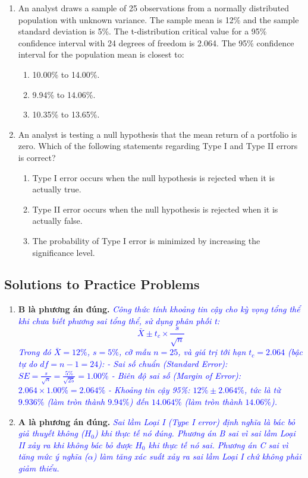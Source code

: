 \begin{enumerate}
	\item An analyst draws a sample of 25 observations from a normally distributed population with unknown variance. The sample mean is 12\% and the sample standard deviation is 5\%. The t-distribution critical value for a 95\% confidence interval with 24 degrees of freedom is 2.064. The 95\% confidence interval for the population mean is closest to:
	      \begin{enumerate}[label=\Alph*.]
		      \item 10.00\% to 14.00\%.
		      \item 9.94\% to 14.06\%.
		      \item 10.35\% to 13.65\%.
	      \end{enumerate}

	\item An analyst is testing a null hypothesis that the mean return of a portfolio is zero. Which of the following statements regarding Type I and Type II errors is correct?
	      \begin{enumerate}[label=\Alph*.]
		      \item Type I error occurs when the null hypothesis is rejected when it is actually true.
		      \item Type II error occurs when the null hypothesis is rejected when it is actually false.
		      \item The probability of Type I error is minimized by increasing the significance level.
	      \end{enumerate}
\end{enumerate}

\subsection{Solutions to Practice Problems}
\label{subsec:app_Solutions_M7}

\begin{enumerate}
	\item \textbf{B là phương án đúng.} \textcolor{blue}{\textit{Công thức tính khoảng tin cậy cho kỳ vọng tổng thể khi chưa biết phương sai tổng thể, sử dụng phân phối t:
	      \[
	      \bar{X} \pm t_c \times \frac{s}{\sqrt{n}}
	      \]
	      Trong đó $\bar{X} = 12\%$, $s = 5\%$, cỡ mẫu $n = 25$, và giá trị tới hạn $t_c = 2.064$ (bậc tự do $df = n - 1 = 24$):
	      - Sai số chuẩn (Standard Error): $SE = \frac{s}{\sqrt{n}} = \frac{5\%}{\sqrt{25}} = 1.00\%$
	      - Biên độ sai số (Margin of Error): $2.064 \times 1.00\% = 2.064\%$
	      - Khoảng tin cậy 95\%: $12\% \pm 2.064\%$, tức là từ $9.936\%$ (làm tròn thành $9.94\%$) đến $14.064\%$ (làm tròn thành $14.06\%$).}}

	\item \textbf{A là phương án đúng.} \textcolor{blue}{\textit{Sai lầm Loại I (Type I error) định nghĩa là bác bỏ giả thuyết không ($H_0$) khi thực tế nó đúng.
	      Phương án B sai vì sai lầm Loại II xảy ra khi không bác bỏ được $H_0$ khi thực tế nó sai. Phương án C sai vì tăng mức ý nghĩa ($\alpha$) làm tăng xác suất xảy ra sai lầm Loại I chứ không phải giảm thiểu.}}
\end{enumerate}

